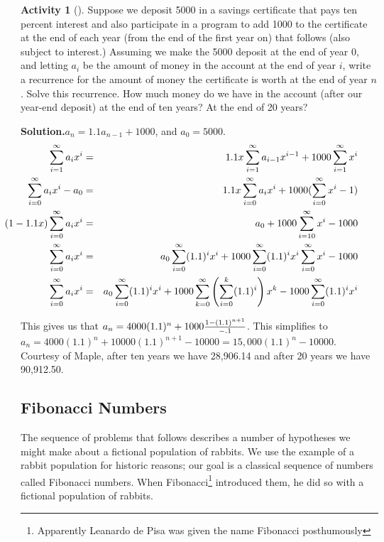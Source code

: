 \documentclass[10pt,]{book}
\theoremstyle{plain}
\theoremstyle{definition}
\newtheorem{activity}[project]{Activity}
\numberwithin{equation}{chapter}
\newcommand{\amp}{&}
\begin{document}
\begin{activity}[]\label{activity-184}
Suppose we deposit \textdollar{}5000 in a savings certificate that pays ten percent interest and also participate in a program to add \textdollar{}1000 to the certificate at the end of each year (from the end of the first year on) that follows (also subject to interest.) Assuming we make the \textdollar{}5000 deposit at the end of year 0, and letting \(a_i\) be the amount of money in the account at the end of year \(i\), write a recurrence for the amount of money the certificate is worth at the end of year \(n\). Solve this recurrence. How much money do we have in the account (after our year-end deposit) at the end of ten years?  At the end of 20 years?%
\par\medskip\noindent%
\textbf{Solution.}\quad \(a_n=1.1a_{n-1}+1000\), and \(a_0=5000\).%
\begin{align*}
\sum_{i=1}^\infty
a_ix^i\amp =\amp 1.1x\sum_{i=1}^\infty a_{i-1}x^{i-1} + 1000\sum_{i=1}^\infty x^i\\
\hspace{-.25 in}\sum_{i=0}^\infty a_ix^i -a_0\amp =\amp 
1.1x\sum_{i=0}^\infty a_ix^i +1000(\sum_{i=0}^\infty x^i-1)\\
\hspace{-.5
in}(1-1.1x)\sum_{i=0}^\infty a_ix^i \amp =\amp  a_0 +1000\sum_{i=10}^\infty x^i-1000\\
\sum_{i=0}^\infty a_i x^i\amp =\amp  a_0\sum_{i=0}^\infty (1.1)^ix^i
+1000\sum_{i=0}^\infty (1.1)^ix^i\sum_{i=0}^\infty x^i -1000\\
\sum_{i=0}^\infty a_i x^i\amp =\amp  a_0\sum_{i=0}^\infty (1.1)^ix^i
+1000\sum_{k=0}^\infty \left(\sum_{i=0}^k(1.1)^i\right)x^k
- 1000\sum_{i=0}^\infty (1.1)^ix^i
\end{align*}
%
\par
This gives us that \(a_n= 4000(1.1)^n +1000{1-(1.1)^{n+1}\over
-.1}\). This simplifies to \(a_n= 4000(1.1)^n+10000(1.1)^{n+1}-10000 =
15,000(1.1)^n-10000\). Courtesy of Maple, after ten years we have \textdollar{}28,906.14 and after 20 years we have \textdollar{}90,912.50.%
\end{activity}
\typeout{************************************************}
\typeout{************************************************}
\subsection[{Fibonacci Numbers}]{Fibonacci Numbers}\label{subsection-47}
The sequence of problems that follows describes a number of hypotheses we might make about a fictional population of rabbits. We use the example of a rabbit population for historic reasons; our goal is a classical sequence of numbers called Fibonacci numbers. When Fibonacci\footnote{Apparently Leanardo de Pisa was given the name Fibonacci posthumously\label{fn-13}} introduced them, he did so with a fictional population of rabbits.%
\typeout{************************************************}
\typeout{************************************************}
\end{document}
